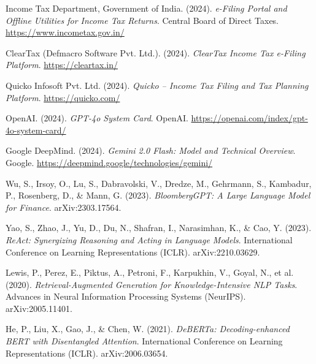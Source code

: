 %

Income Tax Department, Government of India. (2024). \textit{e-Filing Portal and
Offline Utilities for Income Tax Returns}. Central Board of Direct Taxes.
\url{https://www.incometax.gov.in/}

ClearTax (Defmacro Software Pvt. Ltd.). (2024). \textit{ClearTax Income Tax
e-Filing Platform}. \url{https://cleartax.in/}

Quicko Infosoft Pvt. Ltd. (2024). \textit{Quicko -- Income Tax Filing and Tax
Planning Platform}. \url{https://quicko.com/}

OpenAI. (2024). \textit{GPT-4o System Card}. OpenAI.
\url{https://openai.com/index/gpt-4o-system-card/}

Google DeepMind. (2024). \textit{Gemini 2.0 Flash: Model and Technical
Overview}. Google.
\url{https://deepmind.google/technologies/gemini/}

Wu, S., Irsoy, O., Lu, S., Dabravolski, V., Dredze, M., Gehrmann, S., Kambadur,
P., Rosenberg, D., \& Mann, G. (2023). \textit{BloombergGPT: A Large Language
Model for Finance}. arXiv:2303.17564.

Yao, S., Zhao, J., Yu, D., Du, N., Shafran, I., Narasimhan, K., \& Cao, Y.
(2023). \textit{ReAct: Synergizing Reasoning and Acting in Language Models}.
International Conference on Learning Representations (ICLR). arXiv:2210.03629.

Lewis, P., Perez, E., Piktus, A., Petroni, F., Karpukhin, V., Goyal, N., et al.
(2020). \textit{Retrieval-Augmented Generation for Knowledge-Intensive NLP
Tasks}. Advances in Neural Information Processing Systems (NeurIPS).
arXiv:2005.11401.

He, P., Liu, X., Gao, J., \& Chen, W. (2021). \textit{DeBERTa:
Decoding-enhanced BERT with Disentangled Attention}. International Conference on
Learning Representations (ICLR). arXiv:2006.03654.


